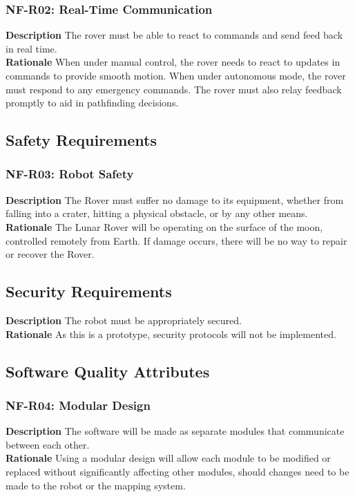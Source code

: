 \documentclass[12pt,a4paper]{article}
\begin{document}
    \subsubsection{NF-R02: Real-Time Communication} 
    \textbf{Description} The rover must be able to react to commands and send feed back in real time.\\
    \textbf{Rationale} When under manual control, the rover needs to react to updates in commands to provide smooth motion. When under autonomous mode, the rover must respond to any emergency commands. The rover must also relay feedback promptly to aid in pathfinding decisions.
	\subsection{Safety Requirements}
    \subsubsection{NF-R03: Robot Safety}
    \textbf{Description} The Rover must suffer no damage to its equipment, whether from falling into a crater, hitting a physical obstacle, or by any other means. \\
    \textbf{Rationale} The Lunar Rover will be operating on the surface of the moon, controlled remotely from Earth. If damage occurs, there will be no way to repair or recover the Rover. \\

\subsection{Security Requirements}
\textbf{Description} The robot must be appropriately secured.\\
    \textbf{Rationale} As this is a prototype, security protocols will not be implemented.\\

	\subsection{Software Quality Attributes}
    \subsubsection{NF-R04: Modular Design}
    \textbf{Description} The software will be made as separate modules that communicate between each other.\\
    \textbf{Rationale} Using a modular design will allow each module to be modified or replaced without significantly affecting other modules, should changes need to be made to the robot or the mapping system.
	\newpage
\end{document}

